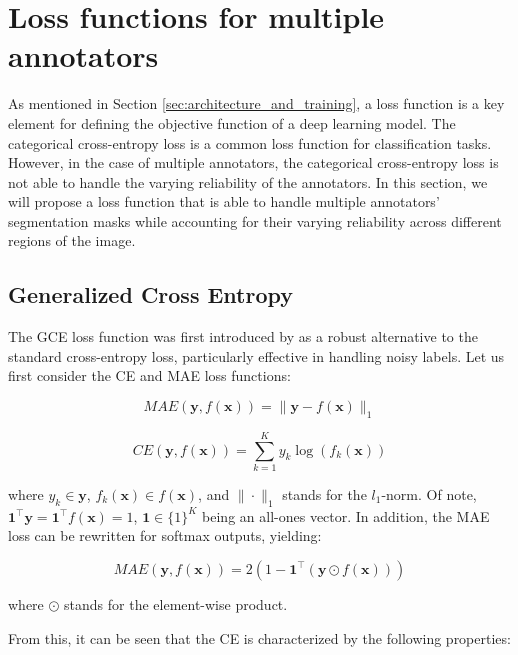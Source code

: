\section{Loss functions for multiple annotators}

As mentioned in Section \ref{sec:architecture_and_training}, a loss
function is a key element for defining the objective function of a
deep learning model. The categorical cross-entropy loss is a common
loss function for classification tasks. However, in the case of
multiple annotators, the categorical cross-entropy loss is not able
to handle the varying reliability of the annotators. In this section,
we will propose a loss function that is able to handle multiple
annotators' segmentation masks while accounting for their varying reliability
across different regions of the image.
\subsection{Generalized Cross Entropy}

The \gls{GCE} loss function was first introduced by
\cite{ZhangEtAl2018} as a robust alternative to the standard
cross-entropy loss, particularly effective in handling noisy labels.
Let us first consider the \gls{CE} and \gls{MAE} loss functions:

\begin{equation}
  MAE(\mathbf{y}, f(\mathbf{x})) = \|\mathbf{y} - f(\mathbf{x})\|_1
\end{equation}

\begin{equation}
  CE(\mathbf{y}, f(\mathbf{x})) = \sum_{k=1}^K y_k \log(f_k(\mathbf{x}))
\end{equation}

where $y_k \in \mathbf{y}$, $f_k(\mathbf{x}) \in f(\mathbf{x})$, and
$\|\cdot\|_1$ stands for the $l_1$-norm. Of note,
$\mathbf{1}^\top\mathbf{y} = \mathbf{1}^\top f(\mathbf{x}) = 1$,
$\mathbf{1} \in \{1\}^K$ being an all-ones vector. In addition, the
MAE loss can be rewritten for softmax outputs, yielding:

\begin{equation}
  MAE(\mathbf{y}, f(\mathbf{x})) = 2(1 - \mathbf{1}^\top(\mathbf{y}
  \odot f(\mathbf{x})))
\end{equation}

where $\odot$ stands for the element-wise product.

From this, it can be seen that the \gls{CE} is characterized by the
following properties:

